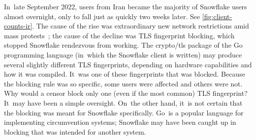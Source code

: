 \documentclass[letterpaper,twocolumn]{article}
\begin{document}

In~late September 2022,
users from Iran became the majority of Snowflake users almost overnight,
only to fall just as quickly two weeks later.
See \autoref{fig:client-counts-ir}.
The cause of the rise was
extraordinary new network restrictions amid mass protests~\cite{ooni-2022-iran-blocks-social-media-mahsa-amini-protests};
the cause of the decline was TLS fingerprint blocking,
which stopped Snowflake rendezvous from working.
The crypto/tls package of the Go programming language
(in~which the Snowflake client is written)
may produce several slightly different TLS fingerprints,
depending on hardware capabilities and how it was compiled.
It~was one of these fingerprints that was blocked.
Because the blocking rule was so specific,
some users were affected and others were not.
Why would a censor block only one (even if the most common)
TLS fingerprint?
It~may have been a simple oversight.
On~the other hand, it~is not certain that the blocking
was meant for Snowflake specifically.
Go~is a popular language for implementing circumvention systems;
Snowflake may have been caught up in blocking that was intended for another system.
\end{document}
